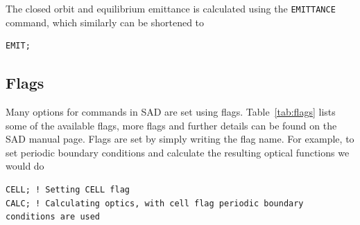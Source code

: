 \documentclass{article}
\begin{document}
The closed orbit and equilibrium emittance is calculated using the \texttt{EMITTANCE} command, which similarly can be shortened to
\begin{lstlisting}
EMIT;
\end{lstlisting}


\subsection{Flags}
Many options for commands in SAD are set using flags. Table~\ref{tab:flags} lists some of the available flags, more flags and further details can be found on the SAD manual page.
Flags are set by simply writing the flag name. For example, to set periodic boundary conditions and calculate the resulting optical functions we would do
\begin{lstlisting}
CELL; ! Setting CELL flag
CALC; ! Calculating optics, with cell flag periodic boundary conditions are used
\end{lstlisting}
%
\end{document}
